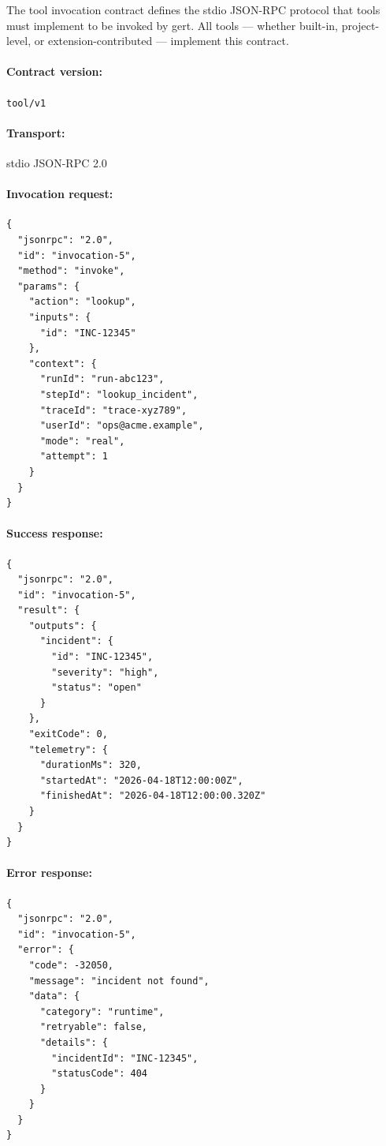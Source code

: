The tool invocation contract defines the stdio JSON-RPC protocol that tools
must implement to be invoked by gert.  All tools — whether built-in,
project-level, or extension-contributed — implement this contract.

\paragraph{Contract version:} \texttt{tool/v1}

\paragraph{Transport:} stdio JSON-RPC 2.0

\paragraph{Invocation request:}

\begin{verbatim}
{
  "jsonrpc": "2.0",
  "id": "invocation-5",
  "method": "invoke",
  "params": {
    "action": "lookup",
    "inputs": {
      "id": "INC-12345"
    },
    "context": {
      "runId": "run-abc123",
      "stepId": "lookup_incident",
      "traceId": "trace-xyz789",
      "userId": "ops@acme.example",
      "mode": "real",
      "attempt": 1
    }
  }
}
\end{verbatim}

\paragraph{Success response:}

\begin{verbatim}
{
  "jsonrpc": "2.0",
  "id": "invocation-5",
  "result": {
    "outputs": {
      "incident": {
        "id": "INC-12345",
        "severity": "high",
        "status": "open"
      }
    },
    "exitCode": 0,
    "telemetry": {
      "durationMs": 320,
      "startedAt": "2026-04-18T12:00:00Z",
      "finishedAt": "2026-04-18T12:00:00.320Z"
    }
  }
}
\end{verbatim}

\paragraph{Error response:}

\begin{verbatim}
{
  "jsonrpc": "2.0",
  "id": "invocation-5",
  "error": {
    "code": -32050,
    "message": "incident not found",
    "data": {
      "category": "runtime",
      "retryable": false,
      "details": {
        "incidentId": "INC-12345",
        "statusCode": 404
      }
    }
  }
}
\end{verbatim}

